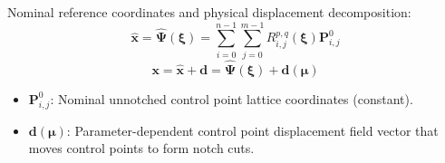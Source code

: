 \documentclass[12pt,a4paper,oneside]{report}
\newcommand{\vect}[1]{\mathbf{#1}}
\begin{document}
Nominal reference coordinates and physical displacement decomposition:
\begin{equation}
    \hat{\vect{x}} = \hat{\boldsymbol{\Psi}}(\boldsymbol{\xi}) = \sum_{i=0}^{n-1} \sum_{j=0}^{m-1} R_{i,j}^{p,q}(\boldsymbol{\xi}) \vect{P}_{i,j}^0
\end{equation}
\begin{equation}
    \vect{x} = \hat{\vect{x}} + \vect{d} = \hat{\boldsymbol{\Psi}}(\boldsymbol{\xi}) + \vect{d}(\boldsymbol{\mu})
\end{equation}
\begin{tcolorbox}[colback=gray!5!white,colframe=gray!60!black,title={Term Definitions \& Parameter Dependencies}]
\begin{itemize}
    \item $\vect{P}_{i,j}^0$: Nominal unnotched control point lattice coordinates (constant).
    \item $\vect{d}(\boldsymbol{\mu})$: Parameter-dependent control point displacement field vector that moves control points to form notch cuts.
\end{itemize}
\end{tcolorbox}
\end{document}
